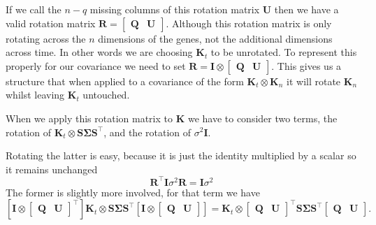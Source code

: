 If we call the $n-q$ missing columns of this rotation matrix $\mathbf{U}$ then we have a valid rotation matrix 
$\mathbf{R}=\begin{bmatrix} \mathbf{Q}& \mathbf{U}\end{bmatrix}$. Although this rotation matrix is only rotating 
across the $n$ dimensions of the genes, not the additional dimensions across time. In other words we are choosing 
$\mathbf{K}_t$ to be unrotated. To represent this properly for our covariance we need to set 
$\mathbf{R} = \mathbf{I} \otimes \begin{bmatrix} \mathbf{Q}& \mathbf{U}\end{bmatrix}$. This gives us a structure 
that when applied to a covariance of the form $\mathbf{K}_t\otimes \mathbf{K}_n$ it will rotate $\mathbf{K}_n$ 
whilst leaving $\mathbf{K}_t$ untouched.

When we apply this rotation matrix to $\mathbf{K}$ we have to consider two terms, 
the rotation of $\mathbf{K}_t \otimes \mathbf{S}\boldsymbol{\Sigma}\mathbf{S}^\top$, 
and the rotation of $\sigma^2 \mathbf{I}$.

Rotating the latter is easy, because it is just the identity multiplied by a scalar so it remains unchanged
\begin{equation} \label{eq:RotatingNoise}
\mathbf{R}^\top\mathbf{I}\sigma^2 \mathbf{R}= \mathbf{I}\sigma^2
\end{equation}
The former is slightly more involved, for that term we have
\begin{equation} \label{eq:svdONK}
\left[\mathbf{I}\otimes \begin{bmatrix}\mathbf{Q} & \mathbf{U}\end{bmatrix}^\top \right]\mathbf{K}_t \otimes 
\mathbf{S}\boldsymbol{\Sigma}\mathbf{S}^\top
\left[ \mathbf{I} \otimes \begin{bmatrix}\mathbf{Q} & \mathbf{U}\end{bmatrix}\right]
=
\mathbf{K}_t \otimes \begin{bmatrix}\mathbf{Q} & \mathbf{U}\end{bmatrix}^\top 
\mathbf{S} \boldsymbol{\Sigma}\mathbf{S}^\top \begin{bmatrix}\mathbf{Q} & \mathbf{U}\end{bmatrix}.
\end{equation}

